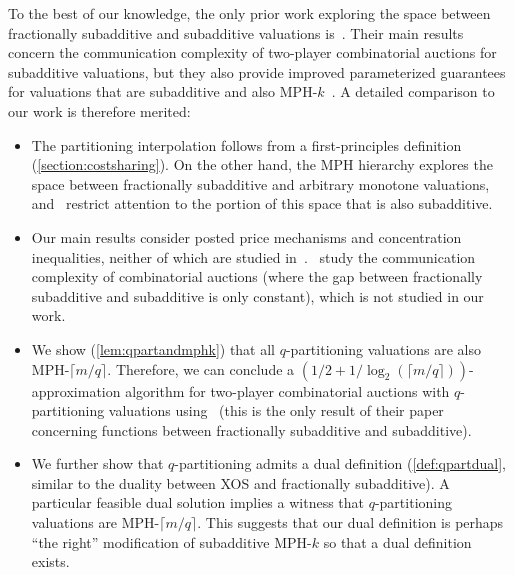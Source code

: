 \documentclass[11pt]{article}\usepackage{amsfonts}
\numberwithin{theorem}{subsection}
\begin{document}
To the best of our knowledge, the only prior work exploring the space between fractionally subadditive and subadditive valuations is~\cite{EzraFNTW19}. Their main results concern the communication complexity of two-player combinatorial auctions for subadditive valuations, but they also provide improved parameterized guarantees for valuations that are subadditive and also MPH-$k$~\cite{FeigeFIILS15}. A detailed comparison to our work is therefore merited:
\begin{itemize}
\item The partitioning interpolation follows from a first-principles definition (\cref{section:costsharing}). On the other hand, the MPH hierarchy explores the space between fractionally subadditive and arbitrary monotone valuations, and~\cite{EzraFNTW19} restrict attention to the portion of this space that is also subadditive.
\item Our main results consider posted price mechanisms and concentration inequalities, neither of which are studied in~\cite{EzraFNTW19}.~\cite{EzraFNTW19} study the communication complexity of combinatorial auctions (where the gap between fractionally subadditive and subadditive is only constant), which is not studied in our work.
\item We show (\cref{lem:qpartandmphk}) that all $q$-partitioning valuations are also MPH-$\lceil m/q\rceil$. Therefore, we can conclude a $(1/2 + 1/\log_2 (\lceil m/q \rceil))$-approximation algorithm for two-player combinatorial auctions with $q$-partitioning valuations using~\cite{EzraFNTW19} (this is the only result of their paper concerning functions between fractionally subadditive and subadditive).
\item We further show that $q$-partitioning admits a dual definition (\cref{def:qpartdual}, similar to the duality between XOS and fractionally subadditive). A particular feasible dual solution implies a witness that $q$-partitioning valuations are MPH-$\lceil m/q\rceil$. This suggests that our dual definition is perhaps ``the right'' modification of subadditive MPH-$k$ so that a dual definition exists.
\end{itemize}
\vspace{2mm}
\end{document}
